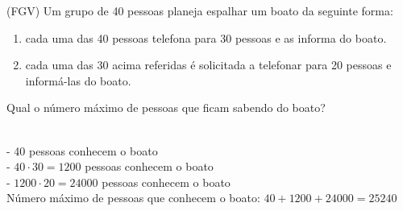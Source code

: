 \begin{ex}
  (FGV) Um grupo de 40 pessoas planeja espalhar um boato da seguinte forma: 
   \begin{enumerate} [-]
       \item  cada uma das 40 pessoas telefona para 30 pessoas e as informa do boato.
       \item  cada uma das 30 acima referidas é solicitada a telefonar para 20 pessoas e informá-las do boato.
   \end{enumerate}
    Qual o número máximo de pessoas que ficam sabendo do boato?
     \begin{sol}
     \phantom{A} \\
     - 40 pessoas conhecem o boato \\
     - $40\cdot30=1200$ pessoas conhecem o boato \\
     - $1200\cdot20=24000$ pessoas conhecem o boato \\
     Número máximo de pessoas que conhecem o boato:   $40+1200+24000=25240$
     \end{sol}
\end{ex}